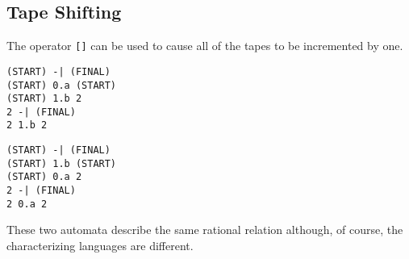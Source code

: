 \subsection{Tape Shifting}
The operator \verb#[]# can be used to cause all of the tapes to be
incremented by one.
\begin{center}\begin{minipage}[t]{3in}\begin{minipage}[t]{3in}\end{minipage}\end{minipage}
\begin{minipage}[t]{1.6in}\begin{verbatim}
(START) -| (FINAL)
(START) 0.a (START)
(START) 1.b 2
2 -| (FINAL)
2 1.b 2
\end{verbatim}\end{minipage}\end{center}
\begin{center}\begin{minipage}[t]{3in}\begin{minipage}[t]{3in}\end{minipage}\end{minipage}
\begin{minipage}[t]{1.6in}\begin{verbatim}
(START) -| (FINAL)
(START) 1.b (START)
(START) 0.a 2
2 -| (FINAL)
2 0.a 2
\end{verbatim}\end{minipage}\end{center}
These two automata describe the same rational relation although, of course,
the characterizing languages are different.

